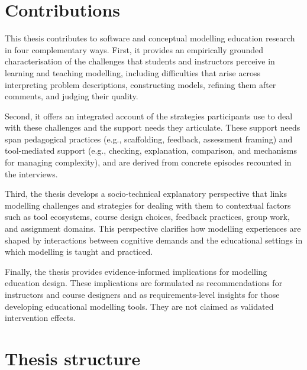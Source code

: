 \section{Contributions}
\label{sec:intro_contributions}

This thesis contributes to software and conceptual modelling education research in four complementary ways. First, it provides an empirically grounded characterisation of the challenges that students and instructors perceive in learning and teaching modelling, including difficulties that arise across interpreting problem descriptions, constructing models, refining them after comments, and judging their quality.

Second, it offers an integrated account of the strategies participants use to deal with these challenges and the support needs they articulate. These support needs span pedagogical practices (e.g., scaffolding, feedback, assessment framing) and tool-mediated support (e.g., checking, explanation, comparison, and mechanisms for managing complexity), and are derived from concrete episodes recounted in the interviews.

Third, the thesis develops a socio-technical explanatory perspective that links modelling challenges and strategies for dealing with them to contextual factors such as tool ecosystems, course design choices, feedback practices, group work, and assignment domains. This perspective clarifies how modelling experiences are shaped by interactions between cognitive demands and the educational settings in which modelling is taught and practiced.

Finally, the thesis provides evidence-informed implications for modelling education design. These implications are formulated as recommendations for instructors and course designers and as requirements-level insights for those developing educational modelling tools. They are not claimed as validated intervention effects.


\section{Thesis structure}
\label{sec:intro_structure}

